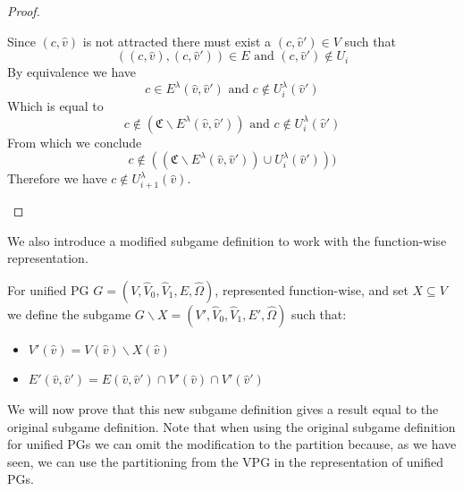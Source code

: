 \begin{lemma}
\begin{proof}
\begin{itemize}
			Since $(c,\hat{v})$ is not attracted there must exist a $(c,\hat{v}') \in V$ such that 
			\[ ((c,\hat{v}),(c,\hat{v}')) \in E  \text{ and } (c,\hat{v}') \notin U_i \]
			By equivalence we have 
			\[ c \in E^\lambda(\hat{v},\hat{v}')  \text{ and } c \notin U^\lambda_i(\hat{v}') \]
			Which is equal to
			\[ c \notin (\mathfrak{C} \backslash E^\lambda(\hat{v},\hat{v}'))  \text{ and } c \notin U^\lambda_i(\hat{v}') \]
			From which we conclude
			\[ c \notin ((\mathfrak{C} \backslash E^\lambda(\hat{v},\hat{v}')) \cup U^\lambda_i(\hat{v}'))) \]
			Therefore we have $c \notin U^\lambda_{i+1}(\hat{v})$.
		\end{itemize}
	\end{proof}
\end{lemma}

We also introduce a modified subgame definition to work with the function-wise representation.
\begin{definition}
	\label{def_Usubgame}
	For unified PG $G = (V,\hat{V}_0,\hat{V}_1,E,\hat{\Omega})$, represented function-wise, and set $X \subseteq V$ we define the subgame $G \backslash X = (V',\hat{V}_0,\hat{V}_1,E',\hat{\Omega})$ such that:
	\begin{itemize}
		\item $V'(\hat{v}) = V(\hat{v}) \backslash X(\hat{v})$
		\item $E'(\hat{v},\hat{v}') = E(\hat{v},\hat{v}') \cap V'(\hat{v}) \cap V'(\hat{v}')$
	\end{itemize}
\end{definition}
We will now prove that this new subgame definition gives a result equal to the original subgame definition. Note that when using the original subgame definition for unified PGs we can omit the modification to the partition because, as we have seen, we can use the partitioning from the VPG in the representation of unified PGs.
